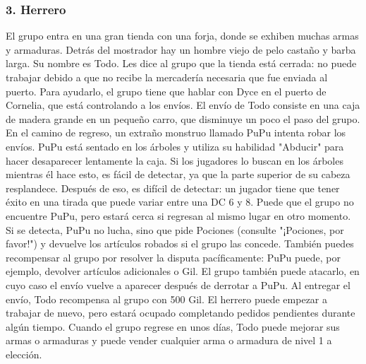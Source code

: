\subsubsection*{3. Herrero}
El grupo entra en una gran tienda con una forja, donde se exhiben muchas armas y armaduras. Detrás del mostrador hay un hombre viejo de pelo castaño y barba larga. Su nombre es Todo. Les dice al grupo que la tienda está cerrada: no puede trabajar debido a que no recibe la mercadería necesaria que fue enviada al puerto. Para ayudarlo, el grupo tiene que hablar con Dyce en el puerto de Cornelia, que está controlando a los envíos. El envío de Todo consiste en una caja de madera grande en un pequeño carro, que disminuye un poco el paso del grupo. En el camino de regreso, un extraño monstruo llamado PuPu intenta robar los envíos. PuPu está sentado en los árboles y utiliza su habilidad "Abducir" para hacer desaparecer lentamente la caja. Si los jugadores lo buscan en los árboles mientras él hace esto, es fácil de detectar, ya que la parte superior de su cabeza resplandece. Después de eso, es difícil de detectar: un jugador tiene que tener éxito en una tirada que puede variar entre una DC 6 y 8. Puede que el grupo no encuentre PuPu, pero estará cerca si regresan al mismo lugar en otro momento. Si se detecta, PuPu no lucha, sino que pide Pociones (consulte "¡Pociones, por favor!") y devuelve los artículos robados si el grupo las concede. También puedes recompensar al grupo por resolver la disputa pacíficamente: PuPu puede, por ejemplo, devolver artículos adicionales o Gil. El grupo también puede atacarlo, en cuyo caso el envío vuelve a aparecer después de derrotar a PuPu. Al entregar el envío, Todo recompensa al grupo con 500 Gil. El herrero puede empezar a trabajar de nuevo, pero estará ocupado completando pedidos pendientes durante algún tiempo. Cuando el grupo regrese en unos días, Todo puede mejorar sus armas o armaduras y puede vender cualquier arma o armadura de nivel 1 a elección.
\vfill


